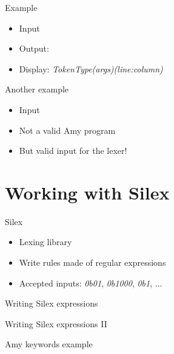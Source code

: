 \documentclass{beamer}
\begin{document}
    \begin{frame}{Example}
        \begin{itemize}
            \item Input
            \item Output:
            \item Display: \emph{TokenType(args)(line:column)}
        \end{itemize}
    \end{frame}

    \begin{frame}{Another example}
        \begin{itemize}
            \item Input
            \item Not a valid Amy program
            \item But valid input for the lexer!
        \end{itemize}
    \end{frame}

    \section{Working with Silex}

    \begin{frame}{Silex}
        \begin{itemize}
            \item Lexing library
            \item Write rules made of regular expressions
        \pause
            \item Accepted inputs: \emph{0b01}, \emph{0b1000}, \emph{0b1}, ...
        \end{itemize}
        
    \end{frame}

    \begin{frame}{Writing Silex expressions}
    \end{frame}

    \begin{frame}{Writing Silex expressions II}
    \end{frame}

    \begin{frame}{Amy keywords example}
    \end{frame}
\end{document}
